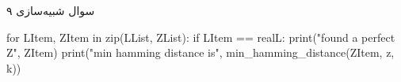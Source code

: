 سوال شبیه‌سازی ۹

\begin{latin}
\begin{python}
for LItem, ZItem in zip(LList, ZList):
    if LItem == realL:
        print("found a perfect Z", ZItem)
        print("min hamming distance is", 
        min_hamming_distance(ZItem, z, k))
\end{python}
\end{latin}